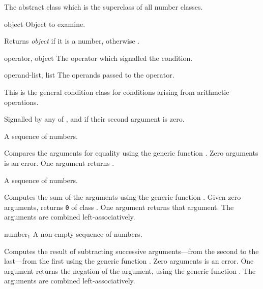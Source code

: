 \begin{optDefinition}
%
The abstract class which is the superclass of all number classes.

%
\begin{arguments}
    \item[object] Object to examine.
\end{arguments}
%
\result%
Returns {\em object\/} if it is a number, otherwise \nil{}.


\begin{initoptions}
    \item[operator, object] The operator which signalled the condition.
    \item[operand-list, list] The operands passed to the operator.
\end{initoptions}
%
\remarks%
This is the general condition class for conditions arising from arithmetic
operations.

%
Signalled by any of ,
 and  if
their second argument is zero.

\function{=}
%
\begin{arguments}
    \item[{\optional{number$_1$ number$_2$ ...}}] A sequence of numbers.
\end{arguments}
%
\result%
Compares the arguments for equality using the generic function
.  Zero arguments is an error.  One argument returns \true.

\function{+}
%
\begin{arguments}
    \item[{\optional{number$_1$ number$_2$ ...}}] A sequence of numbers.
\end{arguments}
%
\result%
Computes the sum of the arguments using the generic function
.  Given zero arguments, \functionref{+} returns {\tt 0} of
class .  One argument returns that argument.  The arguments
are combined left-associatively.

\function{-}
%
\begin{arguments}
    \item[{number$_1$ \optional{number$_2$ ...}}] A non-empty sequence of
    numbers.
\end{arguments}
%
\result%
Computes the result of subtracting successive arguments---from the second to the
last---from the first using the generic function .  Zero
arguments is an error.  One argument returns the negation of the argument, using
the generic function .  The arguments are combined
left-associatively.


\end{optDefinition}
